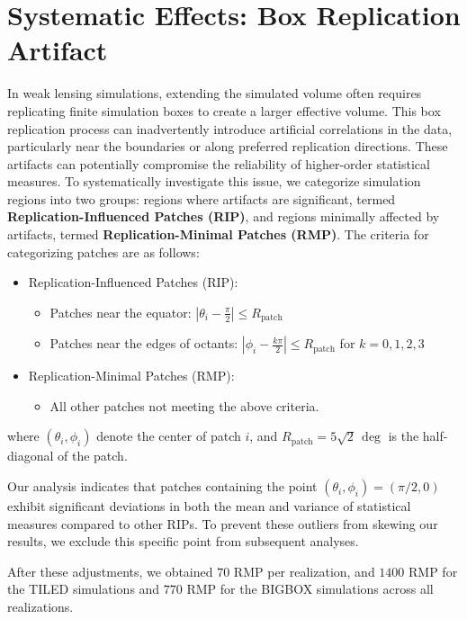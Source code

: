 \clearpage

\section{Systematic Effects: Box Replication Artifact} \label{sec:boxreplication}
In weak lensing simulations, extending the simulated volume often requires replicating finite simulation boxes to create a larger effective volume. This box replication process can inadvertently introduce artificial correlations in the data, particularly near the boundaries or along preferred replication directions. These artifacts can potentially compromise the reliability of higher-order statistical measures. To systematically investigate this issue, we categorize simulation regions into two groups: regions where artifacts are significant, termed \textbf{Replication-Influenced Patches (RIP)}, and regions minimally affected by artifacts, termed \textbf{Replication-Minimal Patches (RMP)}.
The criteria for categorizing patches are as follows:
\begin{itemize} 
    \item Replication-Influenced Patches (RIP):
    \begin{itemize}
        \item Patches near the equator: $ \left| \theta_i - \frac{\pi}{2} \right| \leq R_{\text{patch}} $ 
        \item Patches near the edges of octants: $ \left| \phi_i - \frac{k\pi}{2} \right| \leq R_{\text{patch}} $ for $k = 0, 1, 2, 3$
    \end{itemize}
    \item Replication-Minimal Patches (RMP):
    \begin{itemize}
        \item All other patches not meeting the above criteria.
    \end{itemize}
\end{itemize}
where $(\theta_i, \phi_i)$ denote the center of patch $i$, and $R_{\text{patch}} = 5\sqrt{2}\, \mathrm{\deg}$ is the half-diagonal of the patch.

Our analysis indicates that patches containing the point $(\theta_i, \phi_i) = (\pi/2, 0)$ exhibit significant deviations in both the mean and variance of statistical measures compared to other RIPs. To prevent these outliers from skewing our results, we exclude this specific point from subsequent analyses.

After these adjustments, we obtained $70$ RMP per realization, and $1400$ RMP for the TILED simulations and $770$ RMP for the BIGBOX simulations across all realizations.

